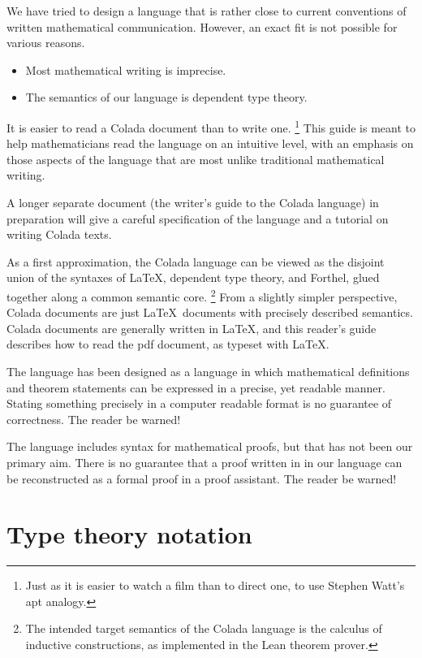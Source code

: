 \documentclass[12pt]{article}
\numberwithin{definition}{section}
\begin{document}
We have tried to design a language that is rather close to current
conventions of written mathematical communication.  However, an exact
fit is not possible for various reasons.

\begin{itemize}
\item Most mathematical writing is imprecise.
\item The semantics of our language is dependent type theory.
\end{itemize}

It is easier to read a Colada document than to write one.%
\footnote{Just as it is easier to watch a film than to direct one, to
  use Stephen Watt's apt analogy.}  
%
This guide is meant to help mathematicians read the language on an
intuitive level, with an emphasis on those aspects of the language
that are most unlike traditional mathematical writing.

A longer separate document (the writer's guide to the Colada language)
in preparation will give a careful specification of the language and a
tutorial on writing Colada texts.

As a first approximation, the Colada language can be viewed as the
disjoint union of the syntaxes of \LaTeX, dependent type theory, and
Forthel, glued together along a common semantic core.%
%
\footnote{The intended target semantics of the Colada language is the
  calculus of inductive constructions, as implemented in the Lean
  theorem prover.}
%
From a slightly simpler perspective, Colada documents are just
\LaTeX\ documents with precisely described semantics.  Colada documents are
generally written in \LaTeX, and this reader's guide describes how to
read the pdf document, as typeset with \LaTeX.

The language has been designed as a language in which mathematical
definitions and theorem statements can be expressed in a precise,
yet readable manner.   Stating something precisely in a computer
readable format is no guarantee of correctness.  The reader be warned!

The language includes syntax for mathematical
proofs, but that has not been our primary aim.  There is no guarantee
that a proof written in in our language can be reconstructed as a formal
proof in a proof assistant. The reader be warned!

\section{Type theory notation}
\end{document}
